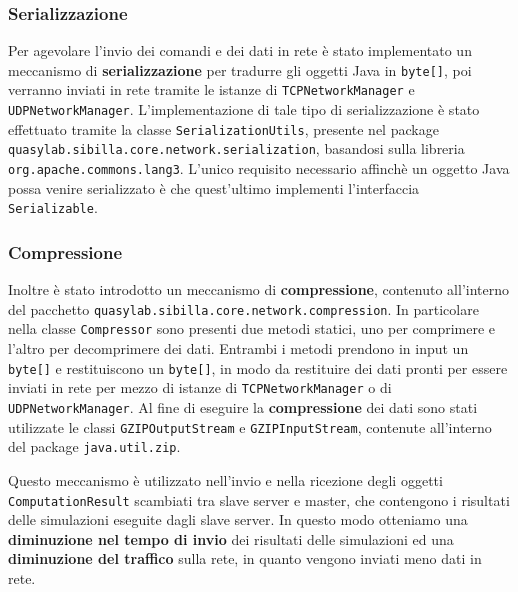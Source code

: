 \subsubsection{Serializzazione}

Per agevolare l'invio dei comandi e dei dati in rete è stato implementato un meccanismo di \textbf{serializzazione} per tradurre gli oggetti Java in \texttt{byte[]}, poi verranno inviati in rete tramite le istanze di \texttt{TCPNetworkManager} e \texttt{UDPNetworkManager}. 
L'implementazione di tale tipo di serializzazione è stato effettuato tramite la classe \texttt{SerializationUtils}, presente nel package \texttt{quasylab.sibilla.core.network.serialization}, basandosi sulla libreria \texttt{org.apache.commons.lang3}.
L'unico requisito necessario affinchè un oggetto Java possa venire serializzato è che quest'ultimo implementi l'interfaccia \texttt{Serializable}.

\subsubsection{Compressione}

Inoltre è stato introdotto un meccanismo di \textbf{compressione}, contenuto all'interno del pacchetto \texttt{quasylab.sibilla.core.network.compression}. In particolare nella classe \texttt{Compressor} sono presenti due metodi statici, uno per comprimere e l'altro per decomprimere dei dati. Entrambi i metodi prendono in input un \texttt{byte[]} e restituiscono un \texttt{byte[]}, in modo da restituire dei dati pronti per essere inviati in rete per mezzo di istanze di \texttt{TCPNetworkManager} o di \texttt{UDPNetworkManager}. Al fine di eseguire la \textbf{compressione} dei dati sono stati utilizzate le classi \texttt{GZIPOutputStream} e \texttt{GZIPInputStream}, contenute all'interno del package \texttt{java.util.zip}.

Questo meccanismo è utilizzato nell'invio e nella ricezione degli oggetti \texttt{ComputationResult} scambiati tra slave server e master, che contengono i risultati delle simulazioni eseguite dagli slave server. In questo modo otteniamo una \textbf{diminuzione nel tempo di invio} dei risultati delle simulazioni ed una \textbf{diminuzione del traffico} sulla rete, in quanto vengono inviati meno dati in rete.